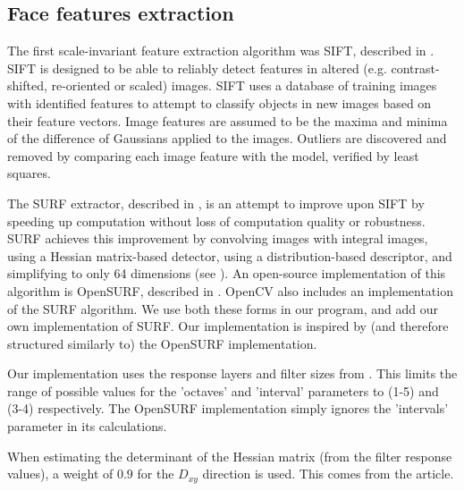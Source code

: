 \subsection{Face features extraction}

The first scale-invariant feature extraction algorithm was SIFT, described in \cite{SIFT}. SIFT is designed to be able to reliably detect features in altered (e.g. contrast-shifted, re-oriented or scaled) images. SIFT uses a database of training images with identified features to attempt to classify objects in new images based on their feature vectors. Image features are assumed to be the maxima and minima of the difference of Gaussians applied to the images. Outliers are discovered and removed by comparing each image feature with the model, verified by least squares.

The SURF extractor, described in \cite{SURF}, is an attempt to improve upon SIFT by speeding up computation without loss of computation quality or robustness. SURF achieves this improvement by convolving images with integral images, using a Hessian matrix-based detector, using a distribution-based descriptor, and simplifying to only 64 dimensions (see \cite{SURF}). An open-source implementation of this algorithm is OpenSURF, described in \cite{OpenSURF}. OpenCV also includes an implementation of the SURF algorithm. We use both these forms in our program, and add our own implementation of SURF. Our implementation is inspired by (and therefore structured similarly to) the OpenSURF implementation.

Our implementation uses the response layers and filter sizes from \cite{SURF}. This limits the range of possible values for the 'octaves' and 'interval' parameters to (1-5) and (3-4) respectively. The OpenSURF implementation simply ignores the 'intervals' parameter in its calculations.

When estimating the determinant of the Hessian matrix (from the filter response values), a weight of $0.9$ for the $D_{xy}$ direction is used. This comes from the article.


